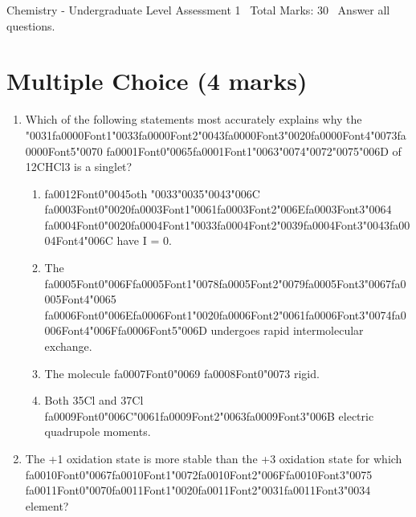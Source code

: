 \documentclass[12pt]{article}
\begin{document}
\begin{center}
Chemistry - Undergraduate Level Assessment 1 \
Total Marks: 30 \
Answer all questions.
\end{center}

\section*{Multiple Choice (4 marks)}
\begin{enumerate}[label=\arabic*.]
\item Which of the following statements most accurately explains why the {\char"0031}{\csname fa0000Font1\endcsname\char"0033}{\csname fa0000Font2\endcsname\char"0043}{\csname fa0000Font3\endcsname\char"0020}{\csname fa0000Font4\endcsname\char"0073}{\csname fa0000Font5\endcsname\char"0070} {\csname fa0001Font0\endcsname\char"0065}{\csname fa0001Font1\endcsname\char"0063}{\char"0074}{\char"0072}{\char"0075}{\char"006D} of 12CHCl3 is a singlet?
\begin{enumerate}[label=(\alph*)]
    \item {\csname fa0012Font0\endcsname\char"0045}oth {\char"0033}{\char"0035}{\char"0043}{\char"006C} {\csname fa0003Font0\endcsname\char"0020}{\csname fa0003Font1\endcsname\char"0061}{\csname fa0003Font2\endcsname\char"006E}{\csname fa0003Font3\endcsname\char"0064} {\csname fa0004Font0\endcsname\char"0020}{\csname fa0004Font1\endcsname\char"0033}{\csname fa0004Font2\endcsname\char"0039}{\csname fa0004Font3\endcsname\char"0043}{\csname fa0004Font4\endcsname\char"006C} have I = 0.
    \item The {\csname fa0005Font0\endcsname\char"006F}{\csname fa0005Font1\endcsname\char"0078}{\csname fa0005Font2\endcsname\char"0079}{\csname fa0005Font3\endcsname\char"0067}{\csname fa0005Font4\endcsname\char"0065} {\csname fa0006Font0\endcsname\char"006E}{\csname fa0006Font1\endcsname\char"0020}{\csname fa0006Font2\endcsname\char"0061}{\csname fa0006Font3\endcsname\char"0074}{\csname fa0006Font4\endcsname\char"006F}{\csname fa0006Font5\endcsname\char"006D} undergoes rapid intermolecular exchange.
    \item The molecule {\csname fa0007Font0\endcsname\char"0069} {\csname fa0008Font0\endcsname\char"0073} rigid.
    \item Both 35Cl and 37Cl {\csname fa0009Font0\endcsname\char"006C}{\char"0061}{\csname fa0009Font2\endcsname\char"0063}{\csname fa0009Font3\endcsname\char"006B} electric quadrupole moments.
\end{enumerate}
\item The +1 oxidation state is more stable than the +3 oxidation state for which {\csname fa0010Font0\endcsname\char"0067}{\csname fa0010Font1\endcsname\char"0072}{\csname fa0010Font2\endcsname\char"006F}{\csname fa0010Font3\endcsname\char"0075} {\csname fa0011Font0\endcsname\char"0070}{\csname fa0011Font1\endcsname\char"0020}{\csname fa0011Font2\endcsname\char"0031}{\csname fa0011Font3\endcsname\char"0034} element?

\end{enumerate}
\end{document}
